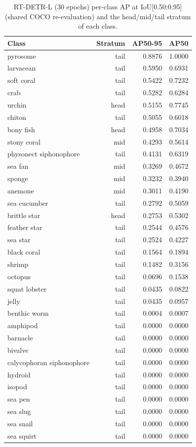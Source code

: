 \documentclass[11pt,a4paper,twocolumn]{article}
\begin{document}
\begin{longtable}{@{}l r r r@{}}
  \caption{RT-DETR-L (30 epochs) per-class AP at IoU[0.50:0.95] (shared COCO re-evaluation) and the head/mid/tail stratum of each class.}\\
  \toprule
  Class & Stratum & AP50-95 & AP50 \\
  \midrule
  \endhead
  pyrosome & tail & 0.8876 & 1.0000 \\
  larvacean & tail & 0.5950 & 0.6931 \\
  soft coral & tail & 0.5422 & 0.7232 \\
  crab & tail & 0.5282 & 0.6284 \\
  urchin & head & 0.5155 & 0.7745 \\
  chiton & tail & 0.5055 & 0.6018 \\
  bony fish & head & 0.4958 & 0.7034 \\
  stony coral & mid & 0.4293 & 0.5614 \\
  physonect siphonophore & tail & 0.4131 & 0.6319 \\
  sea fan & mid & 0.3269 & 0.4672 \\
  sponge & mid & 0.3232 & 0.3940 \\
  anemone & mid & 0.3011 & 0.4190 \\
  sea cucumber & tail & 0.2792 & 0.5059 \\
  brittle star & head & 0.2753 & 0.5302 \\
  feather star & tail & 0.2544 & 0.4576 \\
  sea star & tail & 0.2524 & 0.4227 \\
  black coral & tail & 0.1564 & 0.1894 \\
  shrimp & tail & 0.1482 & 0.3156 \\
  octopus & tail & 0.0696 & 0.1538 \\
  squat lobster & tail & 0.0435 & 0.0822 \\
  jelly & tail & 0.0435 & 0.0957 \\
  benthic worm & tail & 0.0004 & 0.0007 \\
  amphipod & tail & 0.0000 & 0.0000 \\
  barnacle & tail & 0.0000 & 0.0000 \\
  bivalve & tail & 0.0000 & 0.0000 \\
  calycophoran siphonophore & tail & 0.0000 & 0.0000 \\
  hydroid & tail & 0.0000 & 0.0000 \\
  isopod & tail & 0.0000 & 0.0000 \\
  sea pen & tail & 0.0000 & 0.0000 \\
  sea slug & tail & 0.0000 & 0.0000 \\
  sea snail & tail & 0.0000 & 0.0000 \\
  sea squirt & tail & 0.0000 & 0.0000 \\
  \bottomrule
\end{longtable}
\end{document}
